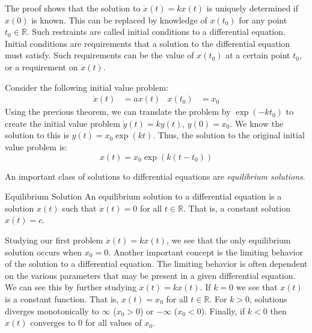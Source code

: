\documentclass[crop=false,class=article,oneside]{standalone}
\begin{document}
        The proof shows that the solution to $\dot{x}(t)=kx(t)$
        is uniquely determined if $x(0)$ is known. This can
        be replaced by knowledge of $x(t_{0})$ for any point
        $t_{0}\in\mathbb{R}$.
        Such restraints are called initial conditions to a
        differential equation. Initial conditions are
        requirements that a solution to the differential
        equation must satisfy. Such requirements can be
        the value of $x(t_{0})$ at a certain point
        $t_{0}$, or a requirement on $\dot{x}(t)$.
        \begin{frameexample}{}{}
            Consider the following initial value problem:
            \begin{align*}
                \dot{x}(t)&=ax(t)
                &
                x(t_{0})&=x_{0}
            \end{align*}
            Using the previous theorem, we can translate the
            problem by $\exp(-kt_{0})$ to create the initial
            value problem $\dot{y}(t)=ky(t)$, $y(0)=x_{0}$.
            We know the solution to this is
            $y(t)=x_{0}\exp(kt)$. Thus, the solution to the
            original initial value problem is:
            \begin{equation*}
                x(t)=x_{0}\exp(k(t-t_{0}))
            \end{equation*}
        \end{frameexample}
        An important class of solutions to differential
        equations are \textit{equilibrium solutions}.
        \begin{framedefinition}{Equilibrium Solution}{}
            An equilibrium solution to a differential
            equation is a solution $x(t)$ such that
            $\dot{x}(t)=0$ for all $t\in\mathbb{R}$.
            That is, a constant solution $x(t)=c$.
        \end{framedefinition}
        Studying our first problem $\dot{x}(t)=kx(t)$,
        we see that the only equilibrium solution
        occurs when $x_{0}=0$. Another important concept
        is the limiting behavior of the solution to a
        differential equation. The limiting behavior
        is often dependent on the various parameters that
        may be present in a given differential equation.
        We can see this by further studying $\dot{x}(t)=kx(t)$.
        If $k=0$ we see that $x(t)$ is a constant function. That
        is, $x(t)=x_{0}$ for all $t\in\mathbb{R}$. For $k>0$,
        solutions diverges monotonically to $\infty$
        ($x_{0}>0$) or $-\infty$ ($x_{0}<0$).
        Finally, if $k<0$ then $x(t)$ converges to $0$
        for all values of $x_{0}$.
\end{document}
